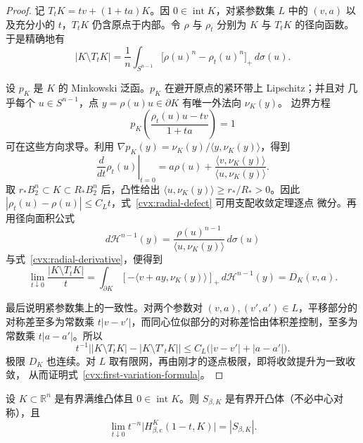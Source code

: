 \begin{proof}
记 $T_tK=tv+(1+ta)K$。因 $0\in\operatorname{int}K$，对紧参数集 $L$ 中的
$(v,a)$ 以及充分小的 $t$，$T_tK$ 仍含原点于内部。令 $\rho$ 与 $\rho_t$ 分别为
$K$ 与 $T_tK$ 的径向函数。于是精确地有
\begin{equation}
 |K\setminus T_tK|=
 \frac1n\int_{S^{n-1}}\bigl[\rho(u)^n-\rho_t(u)^n\bigr]_+\,d\sigma(u).
 \label{cvx:radial-defect}
\end{equation}

设 $p_K$ 是 $K$ 的 Minkowski 泛函。$p_K$ 在避开原点的紧环带上 Lipschitz；并且对
几乎每个 $u\in S^{n-1}$，点 $y=\rho(u)u\in\partial K$ 有唯一外法向 $\nu_K(y)$。
边界方程
\[
 p_K\!\left(\frac{\rho_t(u)u-tv}{1+ta}\right)=1
\]
可在这些方向求导。利用
$\nabla p_K(y)=\nu_K(y)/\langle y,\nu_K(y)\rangle$，得到
\begin{equation}
 \left.\frac d{dt}\rho_t(u)\right|_{t=0}
 =a\rho(u)+\frac{\langle v,\nu_K(y)\rangle}
 {\langle u,\nu_K(y)\rangle}.
 \label{cvx:radial-derivative}
\end{equation}
取 $r_*B_2^n\subset K\subset R_*B_2^n$ 后，凸性给出
$\langle u,\nu_K(y)\rangle\ge r_*/R_*>0$。因此
$|\rho_t(u)-\rho(u)|\le C_Lt$，式~\eqref{cvx:radial-defect} 可用支配收敛定理逐点
微分。再用径向面积公式
\[
 d\mathcal H^{n-1}(y)=
 \frac{\rho(u)^{n-1}}{\langle u,\nu_K(y)\rangle}\,d\sigma(u)
\]
与式~\eqref{cvx:radial-derivative}，便得到
\[
 \lim_{t\downarrow0}\frac{|K\setminus T_tK|}{t}
 =\int_{\partial K}[-\langle v+ay,\nu_K(y)\rangle]_+\,d\mathcal H^{n-1}(y)=D_K(v,a).
\]

最后说明紧参数集上的一致性。对两个参数对 $(v,a),(v',a')\in L$，平移部分的
对称差至多为常数乘 $t|v-v'|$，而同心位似部分的对称差恰由体积差控制，至多为常数乘
$t|a-a'|$。所以
\[
 t^{-1}\bigl||K\setminus T_tK|-|K\setminus T'_tK|\bigr|
 \le C_L\bigl(|v-v'|+|a-a'|\bigr).
\]
极限 $D_K$ 也连续。对 $L$ 取有限网，再由刚才的逐点极限，即将收敛提升为一致收敛，
从而证明式~\eqref{cvx:first-variation-formula}。
\end{proof}

\begin{theorem}[固定凸体的完整切向极限]
\label{cvx:full-tangent-limit}
设 $K\subset\mathbb R^n$ 是有界满维凸体且 $0\in\operatorname{int}K$。则
$S_{\beta,K}$ 是有界开凸体（不必中心对称），且
\begin{equation}
 \lim_{t\downarrow0}t^{-n}\bigl|H^K_{\beta,\mathrm c}(1-t,K)\bigr|
 =|S_{\beta,K}|.
 \label{cvx:full-tangent-formula}
\end{equation}
\end{theorem}

